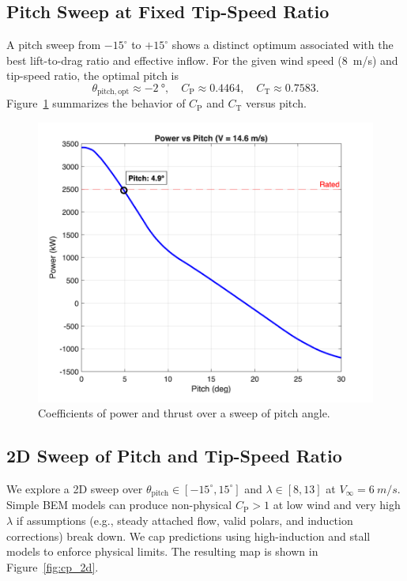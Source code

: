 \documentclass[11pt]{article}
\begin{document}
\subsection{Pitch Sweep at Fixed Tip-Speed Ratio}
A pitch sweep from \(-15^\circ\) to \(+15^\circ\) shows a distinct optimum associated with the best lift-to-drag ratio and effective inflow. For the given wind speed (\SI{8}{m/s}) and tip-speed ratio, the optimal pitch is
\begin{equation*}
\theta_\mathrm{pitch,opt} \approx -\SI{2}{\degree}, \quad C_\mathrm{P} \approx 0.4464, \quad C_\mathrm{T} \approx 0.7583.
\end{equation*}
Figure~\ref{fig:pitch_sweep} summarizes the behavior of \(C_\mathrm{P}\) and \(C_\mathrm{T}\) versus pitch.

\begin{figure}[h]
  \centering
  \includegraphics[width=0.95\linewidth]{../../Deliverable4_Power_vs_Pitch.png}
  \caption{Coefficients of power and thrust over a sweep of pitch angle.}
  \label{fig:pitch_sweep}
\end{figure}

\subsection{2D Sweep of Pitch and Tip-Speed Ratio}
We explore a 2D sweep over \(\theta_\mathrm{pitch} \in [-15^\circ,15^\circ]\) and \(\lambda \in [8,13]\) at \(V_\infty=\SI{6}{m/s}\). Simple BEM models can produce non-physical \(C_\mathrm{P} > 1\) at low wind and very high \(\lambda\) if assumptions (e.g., steady attached flow, valid polars, and induction corrections) break down. We cap predictions using high-induction and stall models to enforce physical limits. The resulting map is shown in Figure~\ref{fig:cp_2d}.
\end{document}
